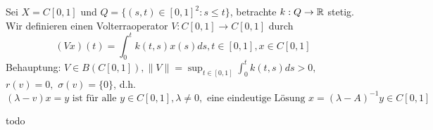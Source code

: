\begin{beispiel}
	Sei $X = C[0, 1]$ und  $Q = \{ (s, t) \in [0, 1]^{2}: s \leq t \}$, betrachte $k: Q \rightarrow \mathbb{R}$ stetig.  \\
	Wir definieren einen Volterraoperator $V: C[0, 1] \rightarrow C[0, 1]$ durch 
		\[ (V x)(t) = \int_{0}^{t} k(t, s) x(s) ds, t \in [0, 1], x \in C[0, 1] \]
	Behauptung: $V \in B(C[0, 1]), \| V \| = \sup_{t \in [0, 1]} \int_{0}^{t} k(t, s) ds > 0,$ $r(v) = 0,$ $\sigma(v) = \{ 0 \}$, d.h. \\
	\[ (\lambda - v)x = y \text{ ist für alle } y \in C[0, 1], \lambda \neq 0, \text{ eine eindeutige Lösung } x = (\lambda - A)^{-1} y \in C[0, 1] \]
\end{beispiel}

\begin{beweis}
	todo %
\end{beweis}



\newpage